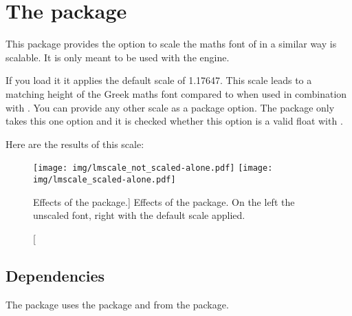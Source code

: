 \chapter{The  package}\label{sec:lmscale}
This package provides the option to scale the maths font of  in a
similar way  is scalable. It is only meant to be used with the
 engine.

If you load it it applies the default scale of \num{1.17647}. This scale leads
to a matching height of the Greek maths font compared to  when used
in combination with . You can provide any other scale as a
package option. The package only takes this one option and it is checked whether
this option is a valid float with .

Here are the results of this scale:

\begin{figure}[htb]%
  \centering
  \texttt{[image: img/lmscale\_not\_scaled-alone.pdf]}%
  \hfil
  \texttt{[image: img/lmscale\_scaled-alone.pdf]}%
  \caption
    [Effects of the  package.]
    {%
      Effects of the  package. On the left the unscaled font,
      right with the default scale applied.%
      \label{fig:lmscale}%
    }%
\end{figure}%

\section{Dependencies}\label{sec:lmscale:dep}%
The package uses the  package and  from the
 package.
